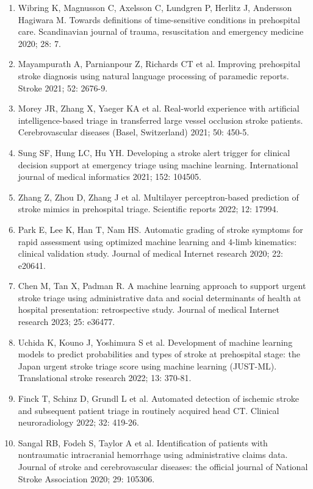 {{\begin{enumerate}
    \item Wibring K, Magnusson C, Axelsson C, Lundgren P, Herlitz J, Andersson Hagiwara M. Towards definitions of time-sensitive conditions in prehospital care. Scandinavian journal of trauma, resuscitation and emergency medicine 2020; 28: 7.
    \item Mayampurath A, Parnianpour Z, Richards CT et al. Improving prehospital stroke diagnosis using natural language processing of paramedic reports. Stroke 2021; 52: 2676-9.
    \item Morey JR, Zhang X, Yaeger KA et al. Real-world experience with artificial intelligence-based triage in transferred large vessel occlusion stroke patients. Cerebrovascular diseases (Basel, Switzerland) 2021; 50: 450-5.
    \item Sung SF, Hung LC, Hu YH. Developing a stroke alert trigger for clinical decision support at emergency triage using machine learning. International journal of medical informatics 2021; 152: 104505.
    \item Zhang Z, Zhou D, Zhang J et al. Multilayer perceptron-based prediction of stroke mimics in prehospital triage. Scientific reports 2022; 12: 17994.
    \item Park E, Lee K, Han T, Nam HS. Automatic grading of stroke symptoms for rapid assessment using optimized machine learning and 4-limb kinematics: clinical validation study. Journal of medical Internet research 2020; 22: e20641.
    \item Chen M, Tan X, Padman R. A machine learning approach to support urgent stroke triage using administrative data and social determinants of health at hospital presentation: retrospective study. Journal of medical Internet research 2023; 25: e36477.
    \item Uchida K, Kouno J, Yoshimura S et al. Development of machine learning models to predict probabilities and types of stroke at prehospital stage: the Japan urgent stroke triage score using machine learning (JUST-ML). Translational stroke research 2022; 13: 370-81.
    \item Finck T, Schinz D, Grundl L et al. Automated detection of ischemic stroke and subsequent patient triage in routinely acquired head CT. Clinical neuroradiology 2022; 32: 419-26.
    \item Sangal RB, Fodeh S, Taylor A et al. Identification of patients with nontraumatic intracranial hemorrhage using administrative claims data. Journal of stroke and cerebrovascular diseases: the official journal of National Stroke Association 2020; 29: 105306.

\end{enumerate}}}
